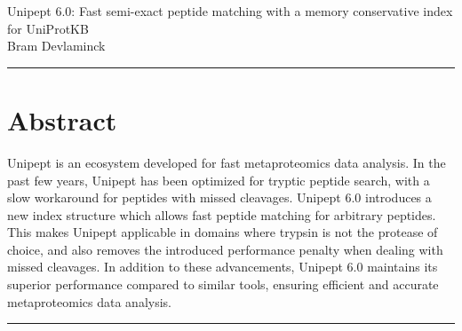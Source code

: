 \documentclass[11pt]{article}
\begin{document}
    \begingroup
    \centering
    \LARGE Unipept 6.0: Fast semi-exact peptide matching with a memory conservative index for UniProtKB\\[1em]
    \large Bram Devlaminck\\[2em]
    \endgroup

    \par\noindent\rule{\linewidth}{.5pt}
    \section*{Abstract}\label{sec:test-section}
    Unipept is an ecosystem developed for fast metaproteomics data analysis.
    In the past few years, Unipept has been optimized for tryptic peptide search, with a slow workaround for peptides with missed cleavages.
    Unipept 6.0 introduces a new index structure which allows fast peptide matching for arbitrary peptides.
    This makes Unipept applicable in domains where trypsin is not the protease of choice, and also removes the introduced performance penalty when dealing with missed cleavages.
    In addition to these advancements, Unipept 6.0 maintains its superior performance compared to similar tools, ensuring efficient and accurate metaproteomics data analysis.
    \par\noindent\rule{\linewidth}{.5pt}
\end{document}

